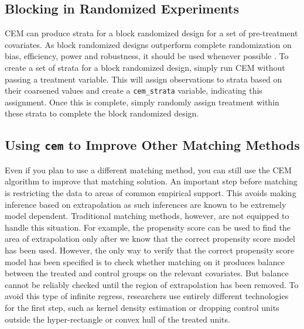 \documentclass[11pt,titlepage]{article}
\begin{document}





\subsection{Blocking in Randomized Experiments} 

CEM can produce strata for a block randomized design for a set of
pre-treatment covariates. As block randomized designs outperform complete
randomization on bias, efficiency, power and robustness, it should be used
whenever possible \citep{ImaKinNal09,ImaKinStu08}. To create a set of
strata for a block randomized design, simply run CEM without passing a
treatment variable. This will assign observations to strata based on their
coarsened values and create a \texttt{cem\_strata} variable, indicating
this assignment. Once this is complete, simply randomly assign treatment
within these strata to complete the block randomized design.

\subsection{Using \texttt{cem} to Improve Other Matching Methods}

Even if you plan to use a different matching method, you can still use the
CEM algorithm to improve that matching solution. An important step before
matching is restricting the data to areas of common empirical support.
This avoids making inference based on extrapolation as such inferences are
known to be extremely model dependent. Traditional matching methods, however,
are not equipped to handle this situation. For example, the propensity
score can be used to find the area of extrapolation only after we know
that the correct propensity score model has been used.  However, the only
way to verify that the correct propensity score model has been specified
is to check whether matching on it produces balance between the treated
and control groups on the relevant covariates.  But balance cannot be
reliably checked until the region of extrapolation has been removed.  To
avoid this type of infinite regress, researchers use entirely different
technologies for the first step, such as kernel density estimation
\citep{HecIchTod97} or dropping control units outside the hyper-rectangle
\citep{IacPor08} or convex hull \citep{KinZen06} of the treated units.
\end{document}
